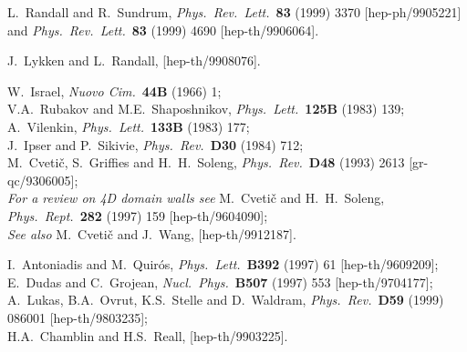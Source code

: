 \documentclass[a4paper,12pt]{article}
\begin{document}
\begin{thebibliography}{99}
L.~Randall and R.~Sundrum,
{\it Phys.\ Rev.\ Lett.}\  {\bf 83} (1999) 3370
[hep-ph/9905221]
and
{\it Phys.\ Rev.\ Lett.}\  {\bf 83} (1999) 4690
[hep-th/9906064].

J.~Lykken and L.~Randall,
[hep-th/9908076].

W.~Israel,
{\it Nuovo Cim.}\ {\bf 44B} (1966) 1;\\
%
V.A.~Rubakov and M.E.~Shaposhnikov,
{\it Phys.\ Lett.}\ {\bf 125B} (1983) 139;\\
%
A.~Vilenkin,
{\it Phys.\ Lett.}\ {\bf 133B} (1983) 177;\\
%
J.~Ipser and P.~Sikivie,
{\it Phys.\ Rev.}\ {\bf D30} (1984) 712;\\
%
M.~Cveti{\v c}, S.~Griffies and H.~H.~Soleng,
{\it Phys.\ Rev.}\  {\bf D48} (1993) 2613
[gr-qc/9306005];\\
%
{\it For a review on 4D domain walls see}
M.~Cveti{\v c} and H.~H.~Soleng,
{\it Phys.\ Rept.}\  {\bf 282} (1997) 159
[hep-th/9604090];\\
%
{\it See also } 
M.~Cveti{\v c} and J.~Wang,
[hep-th/9912187].

I.~Antoniadis and M.~Quir\'os,
{\it Phys.\ Lett.}\  {\bf B392} (1997) 61
[hep-th/9609209];\\
%
E.~Dudas and C.~Grojean,
{\it Nucl.\ Phys.}\  {\bf B507} (1997) 553
[hep-th/9704177];\\
%
A.~Lukas, B.A.~Ovrut, K.S.~Stelle and D.~Waldram,
{\it Phys.\ Rev.}\ {\bf D59} (1999) 086001
[hep-th/9803235];\\
%
H.A.~Chamblin and H.S.~Reall,
[hep-th/9903225].



\end{thebibliography}
\end{document}
